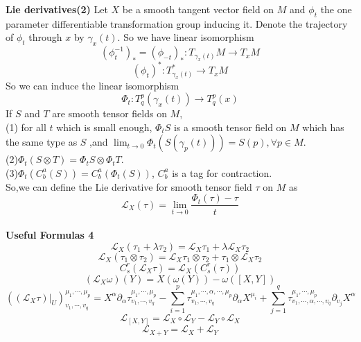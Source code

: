 \documentclass{article}
\begin{document}
\textbf{Lie derivatives(2)} Let $X$ be a smooth tangent vector field on $M$ and $\phi_t$ the one parameter differentiable transformation group inducing it. Denote the trajectory of $\phi_t$ through $x$ by $\gamma_x(t)$. So we have linear isomorphism
\[(\phi_t^{-1})_{*} = (\phi_{-t})_{*} : T_{\gamma_x(t)}M \to T_xM\]
\[(\phi_t)^* : T_{\gamma_x(t)}^* \to T_xM\]
So we can induce the linear isomorphism
\[\Phi_t: T^p_q(\gamma_x(t)) \to T^p_q(x)\]
If $S$ and $T$ are smooth tensor fields on $M$,\\
(1) for all $t$ which is small enough, $\Phi_tS$ is a smooth tensor field on $M$ which has the same type as $S$ ,and $\lim_{t \to 0} \Phi_t(S(\gamma_p(t))) = S(p),\forall p \in M$.\\
(2)$\Phi_t(S \otimes T) = \Phi_tS \otimes \Phi_tT$.\\
(3)$\Phi_t(C^a_b(S)) = C^a_b(\Phi_t(S))$, $C^a_b$ is a tag for contraction.\\
So,we can define the Lie derivative for smooth tensor field $\tau$ on $M$ as
\[\mathcal{L}_{X}(\tau) = \lim_{t \to 0}\frac{\Phi_t(\tau)-\tau}{t}\]\\
\textbf{Useful Formulas 4}
\[\mathcal{L}_X(\tau_1+\lambda \tau_2) = \mathcal{L}_X \tau_1 + \lambda \mathcal{L}_X \tau_2\]
\[\mathcal{L}_X(\tau_1 \otimes \tau_2) = \mathcal{L}_X\tau_1 \otimes \tau_2 + \tau_1 \otimes \mathcal{L}_X \tau_2\]
\[C^r_s(\mathcal{L}_X \tau) = \mathcal{L}_X(C^r_s(\tau))\]
\[(\mathcal{L}_X \omega)(Y) = X(\omega(Y)) - \omega([X,Y])\]
\[((\mathcal{L}_X \tau)|_U)^{\mu_1,\cdots,\mu_p}_{v_1,\cdots,v_q} = X^{\alpha} \partial_{\alpha} \tau^{\mu_1,\cdots,\mu_p}_{v_1,\cdots,v_q} - \sum_{i=1}^{p} \tau^{\mu_1,\cdots,\alpha,\cdots,\mu_p}_{v_1,\cdots,v_q} \partial_{\alpha} X^{\mu_i} + \sum_{j=1}^{q}\tau^{\mu_1,\cdots,\mu_p}_{v_1,\cdots,\alpha,\cdots,v_q} \partial_{v_j}X^{\alpha}\]
\[\mathcal{L}_{[X,Y]} = \mathcal{L}_X \circ \mathcal{L}_Y - \mathcal{L}_Y \circ \mathcal{L}_X \]
\[\mathcal{L}_{X+Y} = \mathcal{L}_{X} + \mathcal{L}_{Y}\]
\end{document}
